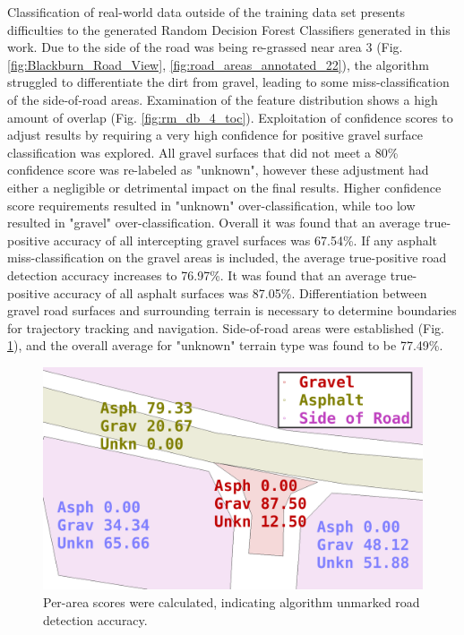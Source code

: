 \documentclass[balance,upint,subscriptcorrection,varvw,mathalfa=cal=boondoxo,colorlinks]{asmeconf}
\begin{document}
	{Classification of real-world data outside of the training data set presents difficulties to the generated Random Decision Forest Classifiers generated in this work. Due to the side of the road was being re-grassed near area $3$ (Fig. \ref{fig:Blackburn_Road_View}, \ref{fig:road_areas_annotated_22}), the algorithm struggled to differentiate the dirt from gravel, leading to some miss-classification of the side-of-road areas. Examination of the feature distribution shows a high amount of overlap (Fig. \ref{fig:rm_db_4_toc}). Exploitation of confidence scores to adjust results by requiring a very high confidence for positive gravel surface classification was explored. All gravel surfaces that did not meet a 80\% confidence score was re-labeled as "unknown", however these adjustment had either a negligible or detrimental impact on the final results. Higher confidence score requirements resulted in "unknown" over-classification, while too low resulted in "gravel" over-classification. Overall it was found that an average true-positive accuracy of all intercepting gravel surfaces was 67.54\%. If any asphalt miss-classification on the gravel areas is included, the average true-positive road detection accuracy increases to 76.97\%. It was found that an average true-positive accuracy of all asphalt surfaces was 87.05\%. Differentiation between gravel road surfaces and surrounding terrain is necessary to determine boundaries for trajectory tracking and navigation. Side-of-road areas were established (Fig. \ref{fig:prepostadjust}), and the overall average for "unknown" terrain type was found to be 77.49\%.}
	
	\begin{figure}
		\centering
		\includegraphics[width=0.9\linewidth]{figures/side_of_road_nums_4_with_filts_2_2}
		\caption[Area Scores]{Per-area scores were calculated, indicating algorithm unmarked road detection accuracy. }
		\label{fig:prepostadjust}
	\end{figure}
	
\end{document}
